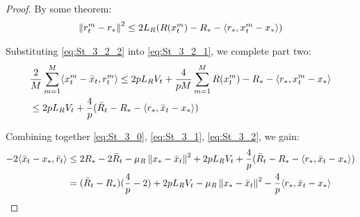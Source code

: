 \begin{proof}
    By some theorem:
    \begin{align}
        \norm{r^m_t-r_*}^2 \leq 2L_R (R(x^m_t) - R_* - \inner {r_*}{x^m_t - x_*}) \label{eq:St_3_2_2}
    \end{align}
    
    Substituting \eqref{eq:St_3_2_2} into \eqref{eq:St_3_2_1}, we complete part two:
    \begin{align}
        &\frac{2}{M} \summ{m=1}{M}{\inner{x^m_t - \bar{x}_t}{r^m_t}}
        \leq 2 p L_R V_t 
        + \frac{4}{pM} \summ{m=1}{M}{R(x^m_t) - R_* - \inner {r_*}{x^m_t - x_*} } \\
        &\leq 2 p L_R V_t 
        + \frac{4}{p} (\bar{R}_t - R_* - \inner {r_*}{\bar{x}_t - x_*}) \label{eq:St_3_2}
    \end{align}
    
    Combining together \eqref{eq:St_3_0}, \eqref{eq:St_3_1}, \eqref{eq:St_3_2}, we gain:
    \begin{align}
         - 2 \inner{\bar{x}_t - x_*}{\bar{r}_t} &\leq
         2 R_* - 2 \bar{R}_t - \mu_R \norm{x_* - \bar{x}_t}^2 
         + 2 p L_R V_t + \frac{4}{p} (\bar{R}_t - R_* - \inner {r_*}{\bar{x}_t - x_*}) \\ 
         &= (\bar{R}_t - R_*)(\frac{4}{p} - 2) + 2 p L_R V_t - \mu_R \norm{x_* - \bar{x}_t}^2 
         - \frac{4}{p}\inner{r_*}{\bar{x}_t - x_*}
         \label{eq:St_3}
    \end{align}
\end{proof}

